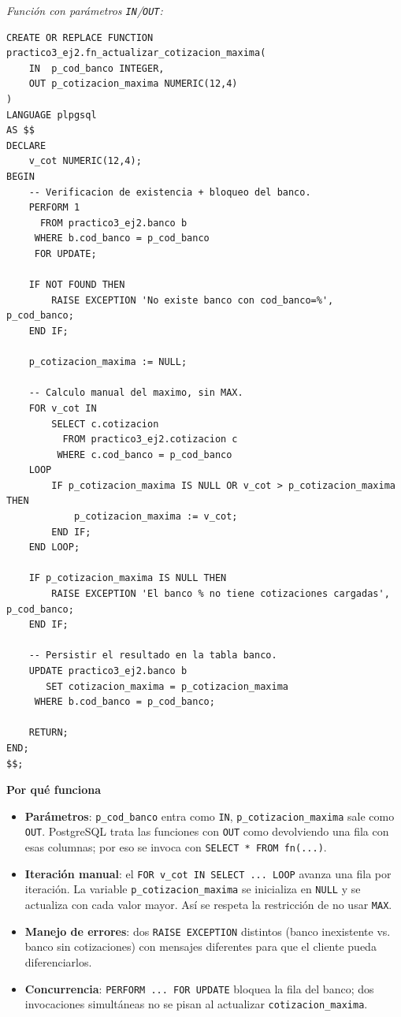 \documentclass[11pt,a4paper]{article}
\newcommand{\itemcabecera}[1]{\noindent\textbf{#1}\par\medskip}
\newcommand{\bloquePorque}{\itemcabecera{Por qu\'e funciona}}
\begin{document}
\textit{Función con parámetros \texttt{IN}/\texttt{OUT}:}

\begin{lstlisting}
CREATE OR REPLACE FUNCTION practico3_ej2.fn_actualizar_cotizacion_maxima(
    IN  p_cod_banco INTEGER,
    OUT p_cotizacion_maxima NUMERIC(12,4)
)
LANGUAGE plpgsql
AS $$
DECLARE
    v_cot NUMERIC(12,4);
BEGIN
    -- Verificacion de existencia + bloqueo del banco.
    PERFORM 1
      FROM practico3_ej2.banco b
     WHERE b.cod_banco = p_cod_banco
     FOR UPDATE;

    IF NOT FOUND THEN
        RAISE EXCEPTION 'No existe banco con cod_banco=%', p_cod_banco;
    END IF;

    p_cotizacion_maxima := NULL;

    -- Calculo manual del maximo, sin MAX.
    FOR v_cot IN
        SELECT c.cotizacion
          FROM practico3_ej2.cotizacion c
         WHERE c.cod_banco = p_cod_banco
    LOOP
        IF p_cotizacion_maxima IS NULL OR v_cot > p_cotizacion_maxima THEN
            p_cotizacion_maxima := v_cot;
        END IF;
    END LOOP;

    IF p_cotizacion_maxima IS NULL THEN
        RAISE EXCEPTION 'El banco % no tiene cotizaciones cargadas', p_cod_banco;
    END IF;

    -- Persistir el resultado en la tabla banco.
    UPDATE practico3_ej2.banco b
       SET cotizacion_maxima = p_cotizacion_maxima
     WHERE b.cod_banco = p_cod_banco;

    RETURN;
END;
$$;
\end{lstlisting}

\bloquePorque

\begin{itemize}
    \item \textbf{Parámetros}: \texttt{p\_cod\_banco} entra como \texttt{IN}, \texttt{p\_cotizacion\_maxima} sale como \texttt{OUT}. PostgreSQL trata las funciones con \texttt{OUT} como devolviendo una fila con esas columnas; por eso se invoca con \texttt{SELECT * FROM fn(...)}.
    \item \textbf{Iteración manual}: el \texttt{FOR v\_cot IN SELECT ... LOOP} avanza una fila por iteración. La variable \texttt{p\_cotizacion\_maxima} se inicializa en \texttt{NULL} y se actualiza con cada valor mayor. Así se respeta la restricción de no usar \texttt{MAX}.
    \item \textbf{Manejo de errores}: dos \texttt{RAISE EXCEPTION} distintos (banco inexistente vs. banco sin cotizaciones) con mensajes diferentes para que el cliente pueda diferenciarlos.
    \item \textbf{Concurrencia}: \texttt{PERFORM ... FOR UPDATE} bloquea la fila del banco; dos invocaciones simultáneas no se pisan al actualizar \texttt{cotizacion\_maxima}.
\end{itemize}
\end{document}
